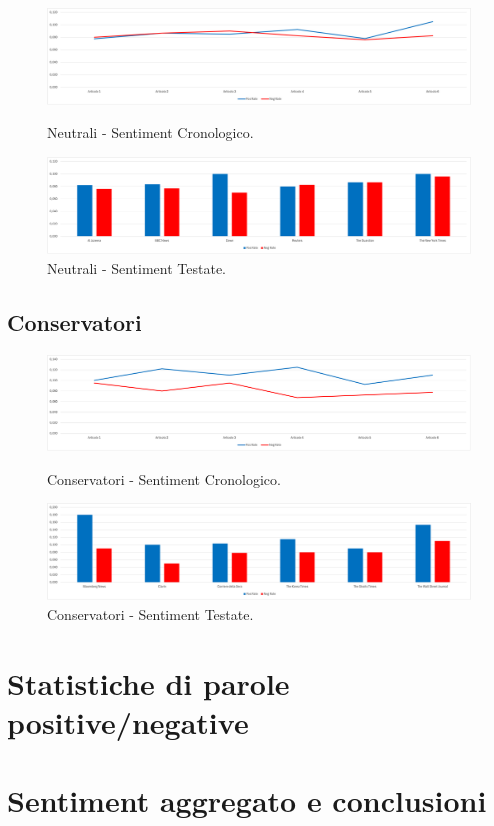 \begin{figure}[H]
    \centering
    \includegraphics[width=1\linewidth]{Immagini/Neutrali/Neutrali- Sentiment Cronologico.png}
    \caption{Neutrali - Sentiment Cronologico.}
    \label{fig:enter-label-a5}

    \centering
    \includegraphics[width=1\linewidth]{Immagini/Neutrali/Neutrali- Sentiment Testate.png}
    \caption{Neutrali - Sentiment Testate.}
    \label{fig:enter-label-a5}
\end{figure}

\newpage
\subsection{Conservatori}

\begin{figure}[H]
    \centering
    \includegraphics[width=1\linewidth]{Immagini/Conservatori/Conservatori - Sentiment Cronologico.png}
    \caption{Conservatori - Sentiment Cronologico.}
    \label{fig:enter-label-a5}

    \centering
    \includegraphics[width=1\linewidth]{Immagini/Conservatori/Cronologico - Sentiment Testate.png}
    \caption{Conservatori - Sentiment Testate.}
    \label{fig:enter-label-a5}
\end{figure}

\section{Statistiche di parole positive/negative}

\section{Sentiment aggregato e conclusioni}